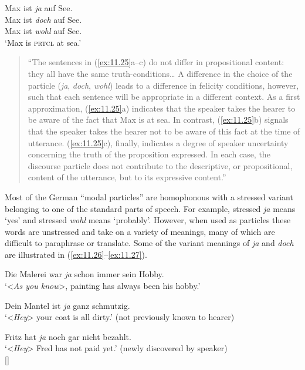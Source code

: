 \ea \label{ex:11.25}
\ea  Max ist \textit{ja} auf See.\\
\ex Max ist \textit{doch} auf See.\\
\ex Max ist \textit{wohl} auf See.\\
‘Max is \textsc{prtcl} at sea.’
\z

\begin{quote}
“The sentences in (\ref{ex:11.25}a–c) do not differ in propositional content: they all have the same truth-conditions… A difference in the choice of the particle (\textit{ja}, \textit{doch}, \textit{wohl}) leads to a difference in felicity conditions, however, such that each sentence will be appropriate in a different context. As a first approximation, (\ref{ex:11.25}a) indicates that the speaker takes the hearer to be aware of the fact that Max is at sea. In contrast, (\ref{ex:11.25}b) signals that the speaker takes the hearer not to be aware of this fact at the time of utterance. (\ref{ex:11.25}c), finally, indicates a degree of speaker uncertainty concerning the truth of the proposition expressed. In each case, the discourse particle does not contribute to the descriptive, or propositional, content of the utterance, but to its expressive content.”
\end{quote}
\z


Most of the German “modal particles” are homophonous with a stressed variant belonging to one of the standard parts of speech. For example, stressed \textit{ja} means ‘yes’ and stressed \textit{wohl} means ‘probably’. However, when used as particles these words are unstressed and take on a variety of meanings, many of which are difficult to paraphrase or translate. Some of the variant meanings of \textit{ja} and \textit{doch} are illustrated in (\ref{ex:11.26}--\ref{ex:11.27}).


\ea \label{ex:11.26}
\ea  Die Malerei war \textit{ja} schon immer sein Hobby.\\
\glt ‘<\textit{As you know}>, painting has always been his hobby.’

\ex  Dein Mantel ist \textit{ja} ganz schmutzig.\\
\glt ‘<\textit{Hey}> your coat is all dirty.’ (not previously known to hearer)

\ex Fritz hat \textit{ja} noch gar nicht bezahlt.\\
\glt ‘<\textit{Hey}> Fred has not paid yet.’ (newly discovered by speaker)\\
{}[\citealt{König1991,KönigEtAl1990,Waltereit2001}]
\z \z

